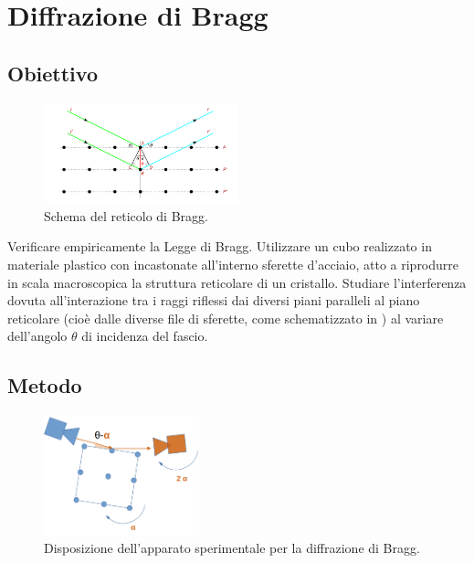 \documentclass[a4paper]{article}
\begin{document}
\section{Diffrazione di Bragg}
\subsection{Obiettivo}
\begin{figure}[htbp]
	\centering
	\includegraphics[width=0.5\textwidth]{grafici/schema.bragg.png}
	\caption{Schema del reticolo di Bragg.}
	\label{fig:schema_bragg}
\end{figure}

Verificare empiricamente la Legge di Bragg. Utilizzare un cubo realizzato in materiale plastico con incastonate all'interno sferette d'acciaio, atto a riprodurre in scala macroscopica la struttura reticolare di un cristallo. Studiare l'interferenza dovuta all'interazione tra i raggi riflessi dai diversi piani paralleli al piano reticolare (cioè dalle diverse file di sferette, come schematizzato in ) al variare dell'angolo $\theta$ di incidenza del fascio.

\subsection{Metodo}
\begin{figure}[htbp]
	\centering
	\includegraphics[width=0.4\textwidth]{grafici/disposizione.bragg.png}
	\caption{Disposizione dell'apparato sperimentale per la diffrazione di Bragg.}
	\label{fig:disposizione_bragg}
\end{figure}
\end{document}
